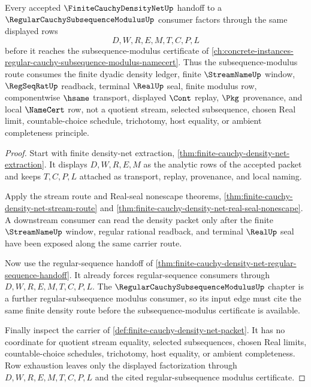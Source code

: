 \begin{theorem}
\label{thm:finite-cauchy-density-net-subsequence-modulus-route}
Every accepted $\FiniteCauchyDensityNetUp$ handoff to a $\RegularCauchySubsequenceModulusUp$ consumer factors through the same displayed rows
$$
D,W,R,E,M,T,C,P,L
$$
before it reaches the subsequence-modulus certificate of \autoref{ch:concrete-instances-regular-cauchy-subsequence-modulus-namecert}. Thus the subsequence-modulus route consumes the finite dyadic density ledger, finite $\StreamNameUp$ window, $\RegSeqRatUp$ readback, terminal $\RealUp$ seal, finite modulus row, componentwise $\hsame$ transport, displayed $\Cont$ replay, $\Pkg$ provenance, and local $\NameCert$ row, not a quotient stream, selected subsequence, chosen Real limit, countable-choice schedule, trichotomy, host equality, or ambient completeness principle.
\end{theorem}
\begin{proof}
Start with finite density-net extraction, \autoref{thm:finite-cauchy-density-net-extraction}. It displays $D,W,R,E,M$ as the analytic rows of the accepted packet and keeps $T,C,P,L$ attached as transport, replay, provenance, and local naming.

Apply the stream route and Real-seal nonescape theorems, \autoref{thm:finite-cauchy-density-net-stream-route} and \autoref{thm:finite-cauchy-density-net-real-seal-nonescape}. A downstream consumer can read the density packet only after the finite $\StreamNameUp$ window, regular rational readback, and terminal $\RealUp$ seal have been exposed along the same carrier route.

Now use the regular-sequence handoff of \autoref{thm:finite-cauchy-density-net-regular-sequence-handoff}. It already forces regular-sequence consumers through $D,W,R,E,M,T,C,P,L$. The $\RegularCauchySubsequenceModulusUp$ chapter is a further regular-subsequence modulus consumer, so its input edge must cite the same finite density route before the subsequence-modulus certificate is available.

Finally inspect the carrier of \autoref{def:finite-cauchy-density-net-packet}. It has no coordinate for quotient stream equality, selected subsequences, chosen Real limits, countable-choice schedules, trichotomy, host equality, or ambient completeness. Row exhaustion leaves only the displayed factorization through $D,W,R,E,M,T,C,P,L$ and the cited regular-subsequence modulus certificate.
\end{proof}

